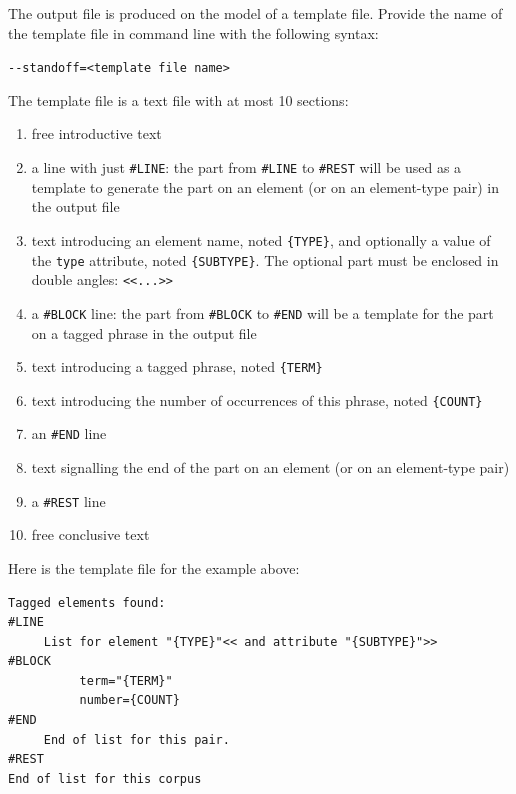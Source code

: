 \noindent The output file is produced on the model of a template file. Provide the name of the template file in
command line with the following syntax:

\verb$--standoff=<template file name>$

\noindent The template file is a text file with at most 10 sections:

\begin{enumerate}
\item free introductive text
\item a line with just \verb$#LINE$: the part from \verb$#LINE$ to \verb$#REST$ will be used as a template
to generate the part on an element (or on an element-type pair) in the output file
\item text introducing an element name, noted \verb${TYPE}$, and optionally a value of the
\verb$type$ attribute, noted \verb${SUBTYPE}$. The optional part must be enclosed in double angles:
\verb$<<...>>$
\item a \verb$#BLOCK$ line: the part from \verb$#BLOCK$ to \verb$#END$ will be a template for
the part on a tagged phrase in the output file
\item text introducing a tagged phrase, noted \verb${TERM}$
\item text introducing the number of occurrences of this phrase, noted \verb${COUNT}$
\item an \verb$#END$ line
\item text signalling the end of the part on an element (or on an element-type pair)
\item a \verb$#REST$ line
\item free conclusive text
\end{enumerate}

\noindent Here is the template file for the example above:
\begin{verbatim}
Tagged elements found:
#LINE
     List for element "{TYPE}"<< and attribute "{SUBTYPE}">>
#BLOCK
          term="{TERM}"
          number={COUNT}
#END
     End of list for this pair.
#REST
End of list for this corpus
\end{verbatim}

